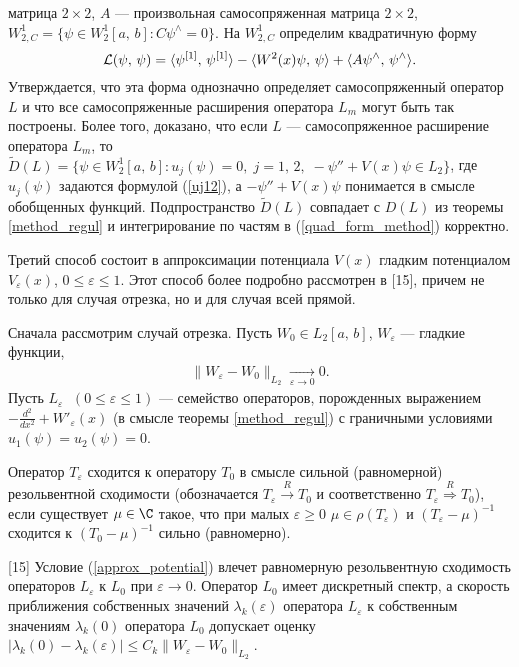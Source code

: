 \documentclass[a4paper
]{article}
\begin{document}
матрица $2\times 2$, $A$ --- произвольная самосопряженная матрица $2\times 2$,
$W^1_{2, C}=\{\psi\in W^1_2[a, \, b]:C\psi^{\wedge}=0\}$. На $W^1_{2,C}$
определим квадратичную форму $${\cal L}(\psi, \, \psi)=\langle \psi^{[1]}, \,
\psi^{[1]}\rangle-\langle W^2(x)\psi, \, \psi\rangle+\langle A\psi
^{\wedge}, \, \psi^{\wedge}\rangle.$$ Утверждается, что эта форма
однозначно определяет самосопряженный оператор $L$ и что все самосопряженные
расширения оператора $L_m$ могут быть так построены. Более того, доказано,
что если $L$ --- самосопряженное расширение оператора $L_m$, то
$\tilde D(L)=\{\psi\in W^1_2[a, \, b]:u_j(\psi)=0, \; j=1, \, 2,\;
-\psi''+V(x)\psi\in L_2\}$, где $u_j(\psi)$ задаются формулой (\ref{uj12}),
а $-\psi''+V(x)\psi$ понимается в смысле обобщенных функций. Подпространство
$\tilde D(L)$ совпадает с $D(L)$ из теоремы \ref{method_regul} и
интегрирование по частям в (\ref{quad_form_method}) корректно.\par
Третий способ состоит в аппроксимации потенциала $V(x)$ гладким потенциалом
$V_\varepsilon(x)$, $0\le \varepsilon\le 1$. Этот способ более подробно
рассмотрен в [15], причем не только для случая отрезка, но и для
случая всей прямой. \par
Сначала рассмотрим случай отрезка. Пусть $W_0\in L_2[a, \, b]$,
$W_\varepsilon$ --- гладкие функции,
\begin{align}
\label{approx_potential}
\|W_\varepsilon -W_0\|_{L_2}\underset{\varepsilon \rightarrow 0}{\rightarrow} 0.
\end{align}
Пусть $L_\varepsilon \;$ $(0\le \varepsilon\le 1)$ --- семейство операторов,
порожденных выражением $-\frac{d^2}{dx^2}+W'_\varepsilon(x)$ (в смысле
теоремы \ref{method_regul}) с граничными условиями $u_1(\psi)=u_2(\psi)=0$.
\begin{Def}
Оператор $T_\varepsilon$ сходится к оператору $T_0$ в смысле сильной
(равномерной) резольвентной сходимости (обозначается $T_\varepsilon
\stackrel{R}{\rightarrow} T_0$ и соответственно $T_\varepsilon
\stackrel{R}{\Rightarrow} T_0$), если существует $\mu \in \C$ такое, что
при малых $\varepsilon \ge 0$ $\mu\in \rho(T_\varepsilon)$ и $(T_\varepsilon
-\mu)^{-1}$ сходится к $(T_0-\mu)^{-1}$ сильно (равномерно).
\end{Def}
\begin{Trm}
\label{trm_appr_potent}
{\rm [15]}
Условие (\ref{approx_potential}) влечет равномерную резольвентную сходимость
операторов $L_\varepsilon$ к $L_0$ при $\varepsilon\rightarrow 0$. Оператор
$L_0$ имеет дискретный спектр, а скорость приближения собственных значений
$\lambda_k(\varepsilon)$ оператора $L_\varepsilon$ к собственным
значениям $\lambda_k(0)$ оператора $L_0$ допускает оценку $|\lambda_k
(0)-\lambda_k(\varepsilon)|\le C_k\|W_\varepsilon-W_0\|_{L_2}$.
\end{Trm}
\end{document}
